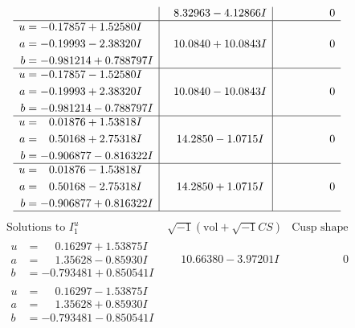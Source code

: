 \documentclass[1p]{elsarticle_modified}
\theoremstyle{definition}
\newcommand{\I}{\sqrt{-1}}
\begin{document}
$$\begin{array}{c|c|c}
 & \phantom{-}8.32963 - 4.12866 I & \phantom{-0.000000 } 0 \\ \hline\begin{aligned}
u &= -0.17857 + 1.52580 I \\
a &= -0.19993 - 2.38320 I \\
b &= -0.981214 + 0.788797 I\end{aligned}
 & \phantom{-}10.0840 + 10.0843 I & \phantom{-0.000000 } 0 \\ \hline\begin{aligned}
u &= -0.17857 - 1.52580 I \\
a &= -0.19993 + 2.38320 I \\
b &= -0.981214 - 0.788797 I\end{aligned}
 & \phantom{-}10.0840 - 10.0843 I & \phantom{-0.000000 } 0 \\ \hline\begin{aligned}
u &= \phantom{-}0.01876 + 1.53818 I \\
a &= \phantom{-}0.50168 + 2.75318 I \\
b &= -0.906877 - 0.816322 I\end{aligned}
 & \phantom{-}14.2850 - 1.0715 I & \phantom{-0.000000 } 0 \\ \hline\begin{aligned}
u &= \phantom{-}0.01876 - 1.53818 I \\
a &= \phantom{-}0.50168 - 2.75318 I \\
b &= -0.906877 + 0.816322 I\end{aligned}
 & \phantom{-}14.2850 + 1.0715 I & \phantom{-0.000000 } 0\\
 \hline 
 \end{array}$$\newpage$$\begin{array}{c|c|c}  
\text{Solutions to }I^u_{1}& \I (\text{vol} + \sqrt{-1}CS) & \text{Cusp shape}\\
 \hline 
\begin{aligned}
u &= \phantom{-}0.16297 + 1.53875 I \\
a &= \phantom{-}1.35628 - 0.85930 I \\
b &= -0.793481 + 0.850541 I\end{aligned}
 & \phantom{-}10.66380 - 3.97201 I & \phantom{-0.000000 } 0 \\ \hline\begin{aligned}
u &= \phantom{-}0.16297 - 1.53875 I \\
a &= \phantom{-}1.35628 + 0.85930 I \\
b &= -0.793481 - 0.850541 I\end{aligned}

\end{array}$$
\end{document}
